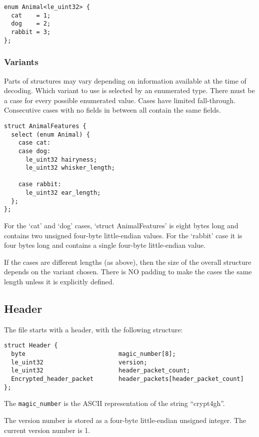 \documentclass[10pt]{article}
\newcommand{\kw}[1]{\texttt{#1}}
\begin{document}
\begin{verbatim}
enum Animal<le_uint32> {
  cat    = 1;
  dog    = 2;
  rabbit = 3;
};
\end{verbatim}

\subsubsection{Variants}
Parts of structures may vary depending on information available at the time of decoding.
Which variant to use is selected by an enumerated type.
There must be a case for every possible enumerated value.
Cases have limited fall-through.
Consecutive cases with no fields in between all contain the same fields.

\begin{verbatim}
struct AnimalFeatures {
  select (enum Animal) {
    case cat:
    case dog:
      le_uint32 hairyness;
      le_uint32 whisker_length;

    case rabbit:
      le_uint32 ear_length;
  };
};
\end{verbatim}

For the `cat' and `dog' cases, `struct AnimalFeatures' is eight bytes long and contains two unsigned four-byte
little-endian values.
For the `rabbit' case it is four bytes long and contains a single four-byte little-endian value.

If the cases are different lengths (as above), then the size of the overall structure depends on the variant chosen.
There is NO padding to make the cases the same length unless it is explicitly defined.

\subsection{Header}

The file starts with a header, with the following structure:

\begin{verbatim}
struct Header {
  byte                          magic_number[8];
  le_uint32                     version;
  le_uint32                     header_packet_count;
  Encrypted_header_packet       header_packets[header_packet_count]
};
\end{verbatim}

The \kw{magic\_number} is the ASCII representation of the string ``crypt4gh''.

The version number is stored as a four-byte little-endian unsigned integer.
The current version number is 1.
\end{document}
